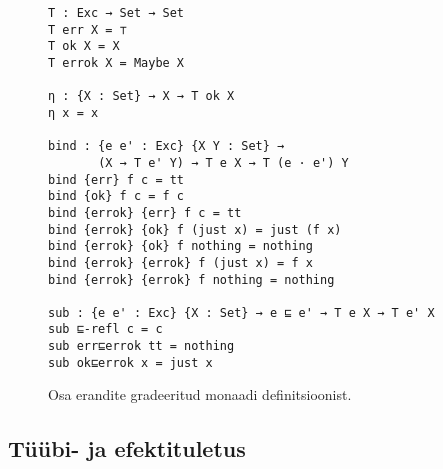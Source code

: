 \documentclass[a4paper,12pt]{article}
\begin{document}
\begin{figure}
  \begin{BVerbatim}
T : Exc → Set → Set
T err X = ⊤
T ok X = X
T errok X = Maybe X

η : {X : Set} → X → T ok X
η x = x
  
bind : {e e' : Exc} {X Y : Set} →
       (X → T e' Y) → T e X → T (e · e') Y
bind {err} f c = tt
bind {ok} f c = f c
bind {errok} {err} f c = tt
bind {errok} {ok} f (just x) = just (f x)
bind {errok} {ok} f nothing = nothing
bind {errok} {errok} f (just x) = f x
bind {errok} {errok} f nothing = nothing

sub : {e e' : Exc} {X : Set} → e ⊑ e' → T e X → T e' X
sub ⊑-refl c = c
sub err⊑errok tt = nothing
sub ok⊑errok x = just x
  \end{BVerbatim}
  \caption{Osa erandite gradeeritud monaadi definitsioonist.}
  \label{fig:exc.graded-monad}
\end{figure}

\subsection{Tüübi- ja efektituletus}\label{ssec:exc.inference}
\end{document}
